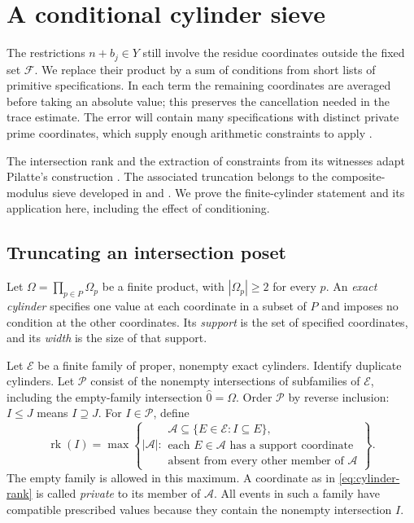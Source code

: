 \section{A conditional cylinder sieve}\label{sec:cylinder-sieve}

The restrictions $n+b_j\in Y$ still involve the residue coordinates
outside the fixed set $\mathcal F$.  We replace their product by a sum
of conditions from short lists of primitive specifications.  In each
term the remaining coordinates are averaged before taking an absolute
value; this preserves the cancellation needed in the trace estimate.
The error will contain many specifications with distinct private prime
coordinates, which supply enough arithmetic constraints to apply
.

The intersection rank and the extraction of constraints from its
witnesses adapt Pilatte's construction
\cite[Definition~13.3 and Lemmas~13.4 and~13.6]{Pilatte26}.
The associated truncation belongs to the composite-modulus sieve
developed in \cite[Section~3]{HR21} and
\cite[Appendix~B]{Pilatte26}.  We prove the finite-cylinder statement
and its application here, including the effect of conditioning.

\subsection{Truncating an intersection poset}

Let $\Omega=\prod_{p\in P}\Omega_p$ be a finite product, with
$|\Omega_p|\ge2$ for every $p$.  An \emph{exact cylinder} specifies one
value at each coordinate in a subset of $P$ and imposes no condition at
the other coordinates.  Its \emph{support} is the set of specified
coordinates, and its \emph{width} is the size of that support.

Let $\mathscr E$ be a finite family of proper, nonempty exact cylinders.
Identify duplicate cylinders.  Let $\mathscr P$ consist of the nonempty
intersections of subfamilies of $\mathscr E$, including the empty-family
intersection $\widehat0=\Omega$.  Order $\mathscr P$ by reverse inclusion:
$I\le J$ means $I\supseteq J$.  For $I\in\mathscr P$, define
\begin{equation}\label{eq:cylinder-rank}
 \operatorname{rk}(I)=
 \max\left\{|\mathscr A|:\begin{array}{l}
   \mathscr A\subseteq\{E\in\mathscr E:I\subseteq E\},\\
   \text{each }E\in\mathscr A\text{ has a support coordinate}\\
   \text{absent from every other member of }\mathscr A
 \end{array}\right\}.
\end{equation}
The empty family is allowed in this maximum.  A coordinate as in
\eqref{eq:cylinder-rank} is called \emph{private} to its member of
$\mathscr A$.  All events in such a family have compatible prescribed
values because they contain the nonempty intersection $I$.


